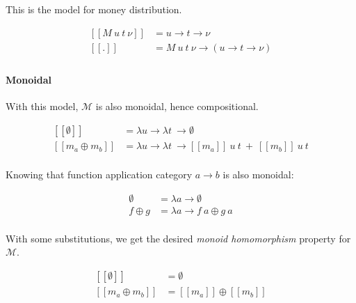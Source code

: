 This is the model for money distribution.

\begin{equation}\label{md_model}
    \begin{split}
        [\![M\ u\ t\ \nu]\!] &= u \rightarrow t \rightarrow \nu \\
        [\![.]\!] &= M\ u\ t\ \nu \rightarrow (u \rightarrow t \rightarrow \nu) \\
    \end{split}
\end{equation}

\paragraph{Monoidal}

With this model, $\mathcal{M}$ is also monoidal, hence compositional.

\begin{equation}
    \begin{split}
        [\![\emptyset]\!] &= \lambda u \rightarrow \lambda t\ \rightarrow \emptyset \\
        [\![m_a \oplus m_b]\!] &= \lambda u \rightarrow \lambda t\ \rightarrow
            [\![m_a]\!]\ u\ t\ +\ [\![m_b]\!]\ u\ t \\
    \end{split}
\end{equation}

Knowing that function application category $a \rightarrow b$ is also monoidal:

\begin{equation}
    \begin{split}
        \emptyset &= \lambda a \rightarrow \emptyset \\
        f \oplus g &= \lambda a \rightarrow f\ a \oplus g\ a \\
    \end{split}
\end{equation}

With some substitutions, we get the desired \textit{monoid homomorphism} property for $\mathcal{M}$.

\begin{equation}
    \begin{split}
        [\![\emptyset]\!] &= \emptyset \\
        [\![m_a \oplus m_b]\!] &= [\![m_a]\!] \oplus [\![m_b]\!] \\
    \end{split}
\end{equation}

